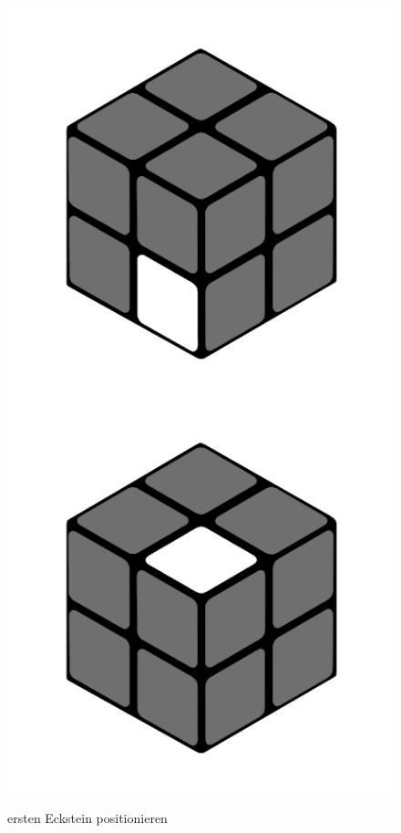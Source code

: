 \documentclass[12pt,a4paper, usenames, dvipsnames]{article}
\theoremstyle{mystyle}
\theoremstyle{definition}
\begin{document}
\begin{figure}[H]
\centering
\includegraphics[scale=0.1]{e1_s1_s1.png}
\includegraphics[scale=0.1]{e1_s1_s2.png}
\caption{ersten Eckstein positionieren}
\label{Abbildung_ErsterEckstein}
\end{figure}
\end{document}
